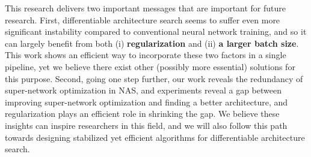 \documentclass{article} \usepackage{iclr2020_conference,times}
\begin{document}
This research delivers two important messages that are important for future research. First, differentiable architecture search seems to suffer even more significant instability compared to conventional neural network training, and so it can largely benefit from both (i) \textbf{regularization} and (ii) \textbf{a larger batch size}. This work shows an efficient way to incorporate these two factors in a single pipeline, yet we believe there exist other (possibly more essential) solutions for this purpose. Second, going one step further, our work reveals the redundancy of super-network optimization in NAS, and experiments reveal a gap between improving super-network optimization and finding a better architecture, and regularization plays an efficient role in shrinking the gap. We believe these insights can inspire researchers in this field, and we will also follow this path towards designing stabilized yet efficient algorithms for differentiable architecture search.







\iffalse
\appendix
\section{Appendix}
\textcolor{red}{
\subsection{FLOPs Constraint}
Despite the performance of the searched architecture, we also consider about its computation complexity (FLOPs). Such constraint during search phase can be reflected as a FLOPs regularizer in the loss function. 

where  is the cross-entrophy loss of the training of the supernet,  is the FLOPs regularizer:

 contains FLOPs of operations in 
}
\fi
\end{document}
